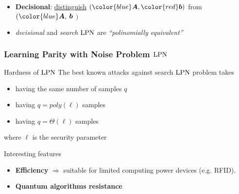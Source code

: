 \begin{frame}
  \begin{itemize}
    \item<5-> \textbf{Decisional}: \underline{distinguish} $\left( {\color{blue}\vect{A}}, {\color{red}\vect{b}} \right)$ from {\color{blue}{uniform}} $( {\color{blue}\vect{A}}, $ {\color{blue} $\boldsymbol{b}$} $)$ 
\vspace{5pt}
    \item<6-> \emph{decisional} and \emph{search} $\mathrm{LPN}$ are \emph{``polinomially equivalent''} \\ 
 \end{itemize}
\end{frame}

\begin{frame}
 \frametitle{Learning Parity with Noise Problem $\mathrm{LPN}$}

  \begin{block}{Hardness of $\mathrm{LPN}$}
  The best known attacks against search $\mathrm{LPN}$ problem takes
  



   \begin{itemize}[<+->]
    \item {} having the same number of samples $q$
    \item {} having $q=poly(\ell)$ samples
    \item {} having $q= \mathcal{\varTheta}(\ell)$ samples
   \end{itemize} 
where $\ell$ is the security parameter
  \end{block}
  
  \begin{block}{Interesting features}
    \begin{itemize}
      \item<4-> \textbf{Efficiency} $\Rightarrow$ suitable for limited computing power devices (e.g. RFID).
      \item<5-> \textbf{Quantum algorithms resistance}
    \end{itemize}
  \end{block}

\end{frame}

